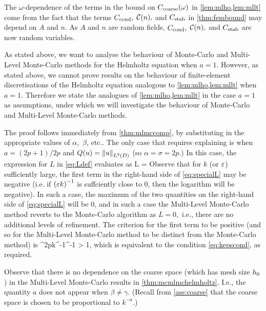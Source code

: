 The $\omega$-dependence of the terms in the bound on $C_{\mathrm{coarse}}(\omega)$ in \cref{lem:mlho,lem:mllt} come from the fact that the terms $C_{\mathrm{cond}},$ $\mathcal C(n),$ and $C_{\mathrm{stab}}$ in \cref{thm:fembound} may depend on $A$ and $n$. As $A$ and $n$ are random fields, $C_{\mathrm{cond}},$ $\mathcal C(n),$ and $C_{\mathrm{stab}}$ are now random variables.
\ere

As stated above, we want to analyse the behaviour of Monte-Carlo and Multi-Level Monte-Carlo methods for the Helmholtz equation when $a=1.$ However, as stated above, we cannot prove results on the behaviour of finite-element discretisations of the Helmholtz equation analogous to \cref{lem:mlho,lem:mllt} when $a=1.$ Therefore we state the analogues of \cref{lem:mlho,lem:mllt} in the case $a=1$ as assumptions, under which we will investigate the behaviour of Monte-Carlo and Multi-Level Monte-Carlo methods.




\label{page:mcmlmchelmholtzproof}
The proof follows immediately from \cref{thm:mlmccomp}, by substituting in the appropriate values of $\alpha,$ $\beta$, etc.. The only case that requires explaining is when $a=(2p+1)/2p$ and $Q(u) = \NLtD{u}$ (so $\alpha = \sigma = 2p.$) In this case, the expression for $L$ in \cref{eq:Ldef} evaluates as
\beq\label{eq:specialL}
L = \max{}
\eeq
Observe that for $k$ (or $\varepsilon$) sufficiently large, the first term in the right-hand side of \cref{eq:specialL} may be negative (i.e. if $\mleft(\eps k\mright)^{-1}$ is suffciently close to 0, then the logarithm will be negative). In such a case, the maximum of the two quantities on the right-hand side of \cref{eq:specialL} will be 0, and in such a case the Multi-Level Monte-Carlo method reverts to the Monte-Carlo algorithm as $L=0,$ i.e., there are no additional levels of refinement. The criterion for the first term to be positive (and so for the Multi-Level Monte-Carlo method to be distinct from the Monte-Carlo method) is
\beqs
{}\co\Ccoarse^{2p}k^{-1}\eps^{-1} > 1,
\eeqs
which is equivalent to the condition \cref{eq:kepscond}, as required.
\epf

Observe that there is no dependence on the coarse space (which has mesh size $h_{0}$) in the Multi-Level Monte-Carlo results in \cref{thm:mcmlmchelmholtz}. I.e., the quantity $a$ does not appear when $\beta \neq \gamma$. (Recall from \cref{ass:coarse} that the coarse space is chosen to be proportional to $k^{-a}$.)

